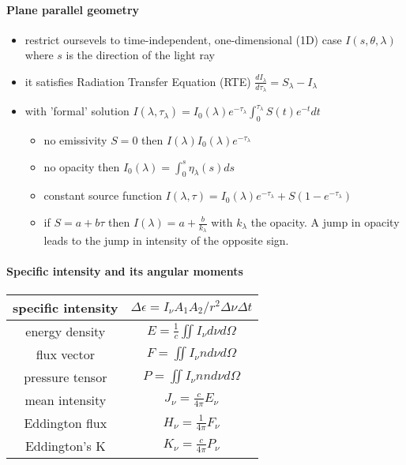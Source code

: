 \documentclass[../main/main.tex]{subfiles}
\begin{document}
\paragraph{Plane parallel geometry}
\begin{itemize}
\item restrict oursevels to time-independent, one-dimensional (1D) case $I(s,\theta,\lambda)$ where $s$ is the direction of the light ray
\item it satisfies Radiation Transfer Equation (RTE) 
$\boxed{\frac{dI_{\lambda}}{d\tau_{\lambda}} = S_{\lambda} - I_{\lambda}}$
\item with 'formal' solution 
$\boxed{I(\lambda,\tau_{\lambda}) = I_0(\lambda) e^{-\tau_{\lambda}}  \int_0^{\tau_{\lambda}}S(t)e^{-t} dt}$
\begin{itemize}
\item no emissivity $S=0$ then $I(\lambda) I_0(\lambda) e^{-\tau_{\lambda}}$
\item no opacity then $I_0(\lambda) = \int_0^{s} \eta_{\lambda}(s)ds$ 
\item constant source function $I(\lambda,\tau) = I_0(\lambda) e^{-\tau_{\lambda}} + S(1-e^{-\tau_{\lambda}})$
\item if $S=a+b\tau$ then $I(\lambda) = a+\frac{b}{k_{\lambda}}$ with $k_{\lambda}$ the opacity. A jump in opacity leads to the jump in intensity of the opposite sign.
\end{itemize}
\end{itemize}

\paragraph{Specific intensity and its angular moments}

\begin{center}
\centering
{\tabulinesep=1.5mm
\begin{tabu}{|c|c|}
\hline 
specific intensity & $\Delta \epsilon = \boxed{I_{\nu}} A_1 A_2/r^2 \Delta \nu \Delta t$ \\ \hline
energy density & $E = \frac{1}{c} \iint I_{\nu} d\nu d\Omega$ \\ \hline
flux vector & $F = \iint I_{\nu}n d\nu d\Omega$ \\ \hline
pressure tensor & $P = \iint I_{\nu} nn d\nu d\Omega$ \\ \hline
mean intensity & $J_{\nu} = \frac{c}{4 \pi} E_{\nu}$ \\ \hline
Eddington flux & $H_{\nu} = \frac{1}{4 \pi} F_{\nu}$ \\ \hline
Eddington's K & $K_{\nu} = \frac{c}{4 \pi}P_{\nu}$ \\ \hline
\end{tabu}}
\end{center}
\end{document}
